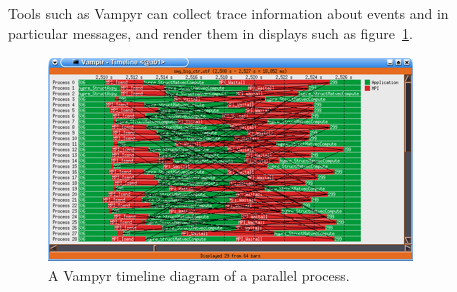 Tools such as Vampyr can collect trace information about
events and in particular messages, and render them in displays such as
figure~\ref{fig:vampyr}.
\begin{figure}[ht]
  \includegraphics{graphics-public/vampyrtrace}
  \caption{A Vampyr timeline diagram of a parallel process.}
  \label{fig:vampyr}
\end{figure}

